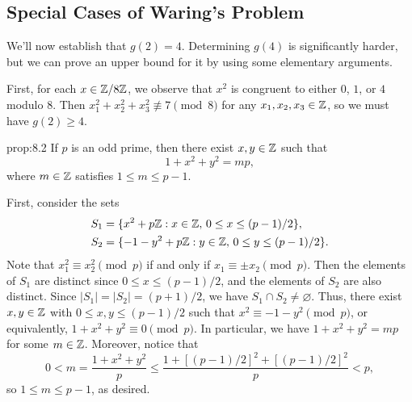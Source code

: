 \subsection{Special Cases of Waring's Problem}\label{subsec:8.2}
We'll now establish that $g(2) = 4$. Determining $g(4)$ is significantly harder,
but we can prove an upper bound for it by using some elementary arguments. 

First, for each $x \in \mathbb{Z}/8\mathbb{Z}$, we observe that 
$x^2$ is congruent to either $0$, $1$, or $4$ modulo $8$. Then 
$x_1^2 + x_2^2 + x_3^2 \not\equiv 7 \pmod 8$ for any $x_1, x_2, x_3 \in \mathbb{Z}$, 
so we must have $g(2) \geq 4$. 

\begin{prop}{prop:8.2}
    If $p$ is an odd prime, then there exist $x, y \in \mathbb{Z}$ such that 
    \[ 1 + x^2 + y^2 = mp, \] 
    where $m \in \mathbb{Z}$ satisfies $1 \leq m \leq p-1$. 
\end{prop}
\begin{pf}
    First, consider the sets 
    \begin{align*}
        S_1 &= \{x^2 + p\mathbb{Z} : x \in \mathbb{Z},\, 0 \leq x \leq (p-1)/2\}, \\ 
        S_2 &= \{-1-y^2 + p\mathbb{Z} : y \in \mathbb{Z},\,0 \leq y \leq (p-1)/2\}.
    \end{align*}
    Note that $x_1^2 \equiv x_2^2 \pmod p$ if and only if $x_1 \equiv 
    \pm x_2 \pmod p$. Then the elements of $S_1$ are distinct since 
    $0 \leq x \leq (p-1)/2$, and the elements of $S_2$ are also distinct. 
    Since $|S_1| = |S_2| = (p+1)/2$, we have $S_1 \cap S_2 \neq \varnothing$. 
    Thus, there exist $x, y \in \mathbb{Z}$ with $0 \leq x, y \leq (p-1)/2$ such that 
    $x^2 \equiv -1-y^2 \pmod p$, or equivalently, $1 + x^2 + y^2 \equiv 0 
    \pmod p$. In particular, we have $1 + x^2 + y^2 = mp$ for some $m \in \mathbb{Z}$. 
    Moreover, notice that 
    \[ 0 < m = \frac{1+x^2+y^2}{p} \leq \frac{1 + [(p-1)/2]^2 + [(p-1)/2]^2}{p} < p, \] 
    so $1 \leq m \leq p-1$, as desired. 
\end{pf}

